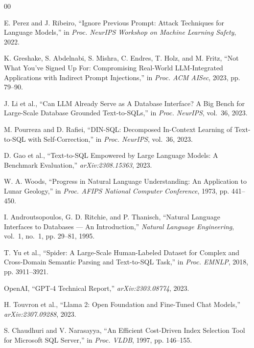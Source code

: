 \documentclass[12pt,a4paper]{report}
\begin{document}
\newpage
{}
\begin{thebibliography}{00}

E. Perez and J. Ribeiro, ``Ignore Previous Prompt: Attack Techniques for Language Models,'' in \textit{Proc. NeurIPS Workshop on Machine Learning Safety}, 2022.

K. Greshake, S. Abdelnabi, S. Mishra, C. Endres, T. Holz, and M. Fritz, ``Not What You've Signed Up For: Compromising Real-World LLM-Integrated Applications with Indirect Prompt Injections,'' in \textit{Proc. ACM AISec}, 2023, pp. 79--90.

J. Li et al., ``Can LLM Already Serve as A Database Interface? A Big Bench for Large-Scale Database Grounded Text-to-SQLs,'' in \textit{Proc. NeurIPS}, vol.~36, 2023.

M. Pourreza and D. Rafiei, ``DIN-SQL: Decomposed In-Context Learning of Text-to-SQL with Self-Correction,'' in \textit{Proc. NeurIPS}, vol.~36, 2023.

D. Gao et al., ``Text-to-SQL Empowered by Large Language Models: A Benchmark Evaluation,'' \textit{arXiv:2308.15363}, 2023.

W. A. Woods, ``Progress in Natural Language Understanding: An Application to Lunar Geology,'' in \textit{Proc. AFIPS National Computer Conference}, 1973, pp. 441--450.

I. Androutsopoulos, G. D. Ritchie, and P. Thanisch, ``Natural Language Interfaces to Databases --- An Introduction,'' \textit{Natural Language Engineering}, vol.~1, no.~1, pp. 29--81, 1995.

T. Yu et al., ``Spider: A Large-Scale Human-Labeled Dataset for Complex and Cross-Domain Semantic Parsing and Text-to-SQL Task,'' in \textit{Proc. EMNLP}, 2018, pp. 3911--3921.

OpenAI, ``GPT-4 Technical Report,'' \textit{arXiv:2303.08774}, 2023.

H. Touvron et al., ``Llama 2: Open Foundation and Fine-Tuned Chat Models,'' \textit{arXiv:2307.09288}, 2023.

S. Chaudhuri and V. Narasayya, ``An Efficient Cost-Driven Index Selection Tool for Microsoft SQL Server,'' in \textit{Proc. VLDB}, 1997, pp. 146--155.


\end{thebibliography}
\end{document}
